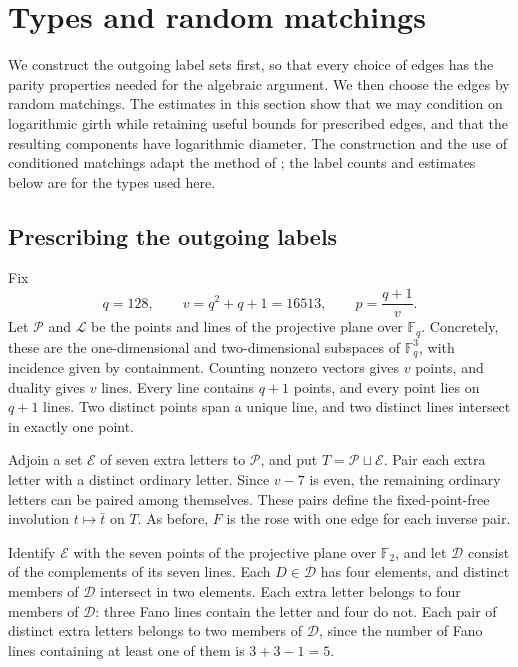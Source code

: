 \section{Types and random matchings}\label{sec:random}

We construct the outgoing label sets first, so that every choice of edges
has the parity properties needed for the algebraic argument.  We then
choose the edges by random matchings.  The estimates in this section show
that we may condition on logarithmic girth while retaining useful bounds
for prescribed edges, and that the resulting components have logarithmic
diameter.  The construction and the use of conditioned matchings adapt
the method of \cite[Section ``Prescribed types and random matchings'']{OpenAI2026ZD};
the label counts and estimates below are for the types used here.

\subsection{Prescribing the outgoing labels}

Fix
\[
 q=128,\qquad v=q^2+q+1=16513,\qquad p=\frac{q+1}{v}.
\]
Let \(\mathcal P\) and \(\mathcal L\) be the points and lines of the
projective plane over \(\mathbb F_q\).  Concretely, these are the
one-dimensional and two-dimensional subspaces of \(\mathbb F_q^3\),
with incidence given by containment.  Counting nonzero vectors gives
\(v\) points, and duality gives \(v\) lines.  Every line contains
\(q+1\) points, and every point lies on \(q+1\) lines.  Two distinct
points span a unique line, and two distinct lines intersect in exactly
one point.

Adjoin a set \(\mathcal E\) of seven extra letters to \(\mathcal P\),
and put \(T=\mathcal P\sqcup\mathcal E\).  Pair each extra letter
with a distinct ordinary letter.  Since \(v-7\) is even, the remaining
ordinary letters can be paired among themselves.  These pairs define
the fixed-point-free involution \(t\mapsto\bar t\) on \(T\).
As before, \(F\) is the rose with one edge for each inverse pair.

Identify \(\mathcal E\) with the seven points of the projective plane
over \(\mathbb F_2\), and let \(\mathcal D\) consist of the complements
of its seven lines.  Each \(D\in\mathcal D\) has four elements, and
distinct members of \(\mathcal D\) intersect in two elements.  Each
extra letter belongs to four members of \(\mathcal D\): three Fano
lines contain the letter and four do not.  Each pair of distinct extra
letters belongs to two members of \(\mathcal D\), since the number of
Fano lines containing at least one of them is \(3+3-1=5\).

